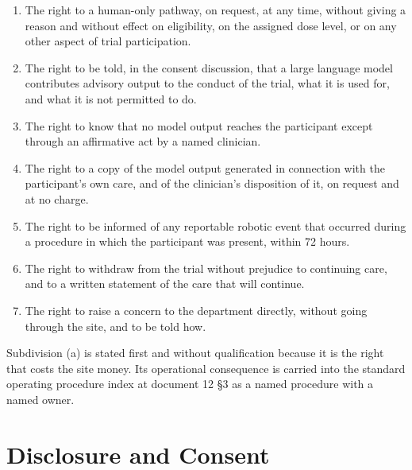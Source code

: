 \begin{enumerate}
\item The right to a human-only pathway, on request, at any time, without giving
  a reason and without effect on eligibility, on the assigned dose level, or on
  any other aspect of trial participation.

\item The right to be told, in the consent discussion, that a large language
  model contributes advisory output to the conduct of the trial, what it is used
  for, and what it is not permitted to do.

\item The right to know that no model output reaches the participant except
  through an affirmative act by a named clinician.

\item The right to a copy of the model output generated in connection with the
  participant's own care, and of the clinician's disposition of it, on request
  and at no charge.

\item The right to be informed of any reportable robotic event that occurred
  during a procedure in which the participant was present, within 72 hours.

\item The right to withdraw from the trial without prejudice to continuing care,
  and to a written statement of the care that will continue.

\item The right to raise a concern to the department directly, without going
  through the site, and to be told how.
\end{enumerate}

Subdivision (a) is stated first and without qualification because it is the
right that costs the site money. Its operational consequence is carried into
the standard operating procedure index at document 12 §3 as a named procedure
with a named owner.

\section{Disclosure and Consent}

